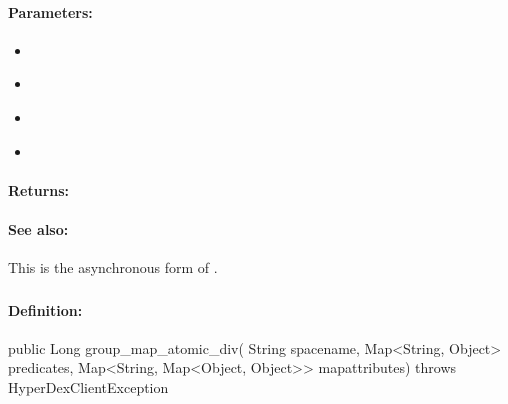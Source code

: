 \paragraph{Parameters:}
\begin{itemize}[noitemsep]
\item {}\\

\item {}\\

\item {}\\

\item {}\\

\end{itemize}

\paragraph{Returns:}


\paragraph{See also:}  This is the asynchronous form of .

\pagebreak
\subsubsection{}
\label{api:java:group_map_atomic_div}


\paragraph{Definition:}
\begin{javacode}
public Long group_map_atomic_div(
        String spacename,
        Map<String, Object> predicates,
        Map<String, Map<Object, Object>> mapattributes) throws HyperDexClientException
\end{javacode}

